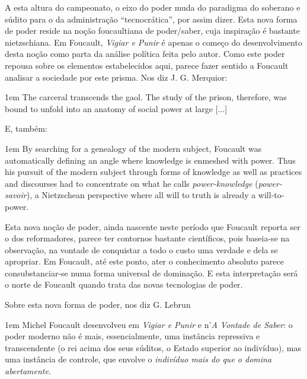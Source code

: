 \documentclass[12pt,a4paper]{article}
\newenvironment{citac}
{
	\begin{addmargin}
		[4cm]{1em} \footnotesize}{\normalfont 
	\end{addmargin}
}
\begin{document}
	A esta altura do campeonato, o eixo do poder muda do paradigma do 
	soberano e súdito para o da administração ``tecnocrática'', por 
	assim dizer. Esta nova forma de poder reside na noção foucaultiana 
	de poder/saber, cuja inspiração é bastante nietzschiana. Em 
	Foucault, \textit{Vigiar e Punir} é apenas o começo do 
	desenvolvimento desta noção como parta da análise política feita 
	pelo autor. Como este poder repousa sobre os elementos estabelecidos 
	aqui, parece fazer sentido a Foucault analisar a sociedade por 
	este prisma. Nos diz J. G. Merquior: 

	\begin{citac}
		The carceral transcends the gaol. The study of the prison, 
		therefore, was bound to unfold into an anatomy of social 
		power at large [...] %
	\end{citac}

	E, também: 

	\begin{citac}
		By searching for a genealogy of the modern subject, Foucault 
		was automatically defining an angle where knowledge is 
		enmeshed with power. Thus his pursuit of the modern subject 
		through forms of knowledge as well as practices and discourses 
		had to concentrate on what he calls \textit{power-knowledge}
		(\textit{power-savoir}), a Nietzschean perspective where all 
		will to truth is already a will-to-power. 
	\end{citac}

	Esta nova noção de poder, ainda nascente neste período que Foucault 
	reporta ser o dos reformadores, parece ter contornos bastante 
	científicos, pois baseia-se na observação, na vontade de conquistar 
	a todo o custo uma verdade e dela se apropriar. Em Foucault, até 
	este ponto, ater o conhecimento absoluto parece consubstanciar-se 
	numa forma universal de dominação. E esta interpretação será o norte 
	de Foucault quando trata das novas tecnologias de poder. 
	
	Sobre esta nova forma de poder, nos diz G. Lebrun
	\begin{citac}
		Michel Foucault desenvolveu em \textit{Vigiar e Punir} 
		e n’\textit{A Vontade de Saber}: o poder moderno não é mais, 
		essencialmente, uma instância repressiva e transcendente 
		(o rei acima dos seus súditos, o Estado superior ao indivíduo), 
		mas uma instância de controle, que envolve o \textit{indivíduo 
		mais do que o domina abertamente}. %
	\end{citac} %
\end{document}
